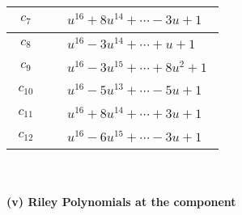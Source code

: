 \documentclass[1p]{elsarticle_modified}
\theoremstyle{definition}
\begin{document}
\begin{tabular}{m{50pt}|m{274pt}}
\hline $$\begin{aligned}c_{7}\end{aligned}$$&$\begin{aligned}
&u^{16}+8 u^{14}+\cdots-3 u+1
\end{aligned}$\\
\hline $$\begin{aligned}c_{8}\end{aligned}$$&$\begin{aligned}
&u^{16}-3 u^{14}+\cdots+u+1
\end{aligned}$\\
\hline $$\begin{aligned}c_{9}\end{aligned}$$&$\begin{aligned}
&u^{16}-3 u^{15}+\cdots+8 u^2+1
\end{aligned}$\\
\hline $$\begin{aligned}c_{10}\end{aligned}$$&$\begin{aligned}
&u^{16}-5 u^{13}+\cdots-5 u+1
\end{aligned}$\\
\hline $$\begin{aligned}c_{11}\end{aligned}$$&$\begin{aligned}
&u^{16}+8 u^{14}+\cdots+3 u+1
\end{aligned}$\\
\hline $$\begin{aligned}c_{12}\end{aligned}$$&$\begin{aligned}
&u^{16}-6 u^{15}+\cdots-3 u+1
\end{aligned}$\\
\hline
\end{tabular}\\~\\
\newpage\renewcommand{\arraystretch}{1}
\flushleft \textbf{(v) Riley Polynomials at the component}\newline \\
\end{document}
